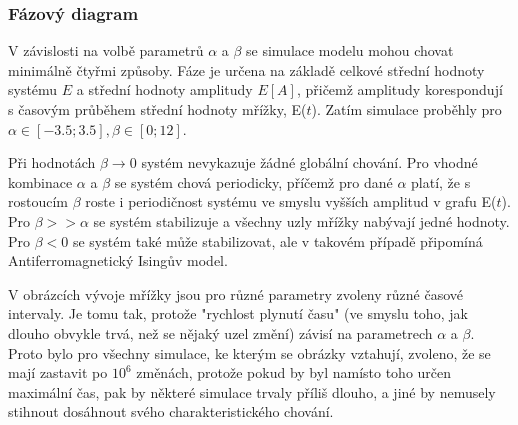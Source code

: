 \documentclass{article}
\begin{document}
\subsubsection{Fázový diagram}
V závislosti na volbě parametrů $\alpha$ a $\beta$ se simulace modelu mohou chovat minimálně čtyřmi způsoby. Fáze je určena na základě celkové střední hodnoty systému $E$ a střední hodnoty amplitudy $E[A]$, přičemž amplitudy korespondují s časovým průběhem střední hodnoty mřížky, E($t$). Zatím simulace proběhly pro $\alpha \in \left[ -3.5; 3.5 \right], \beta \in \left[ 0; 12 \right]$.

Při hodnotách $\beta \rightarrow 0$ systém nevykazuje žádné globální chování. Pro vhodné kombinace $\alpha$ a $\beta$ se systém chová periodicky, příčemž pro dané $\alpha$ platí, že s rostoucím $\beta$ roste i periodičnost systému ve smyslu vyšších amplitud v grafu E($t$). Pro $\beta >> \alpha$ se systém stabilizuje a všechny uzly mřížky nabývají jedné hodnoty. Pro $\beta < 0$ se systém také může stabilizovat, ale v takovém případě připomíná Antiferromagnetický Isingův model.

V obrázcích vývoje mřížky jsou pro různé parametry zvoleny různé časové intervaly. Je tomu tak, protože "rychlost plynutí času" (ve smyslu toho, jak dlouho obvykle trvá, než se nějaký uzel změní) závisí na parametrech $\alpha$ a $\beta$. Proto bylo pro všechny simulace, ke kterým se obrázky vztahují, zvoleno, že se mají zastavit po $10^6$ změnách, protože pokud by byl namísto toho určen maximální čas, pak by některé simulace trvaly příliš dlouho, a jiné by nemusely stihnout dosáhnout svého charakteristického chování. 
\end{document}
